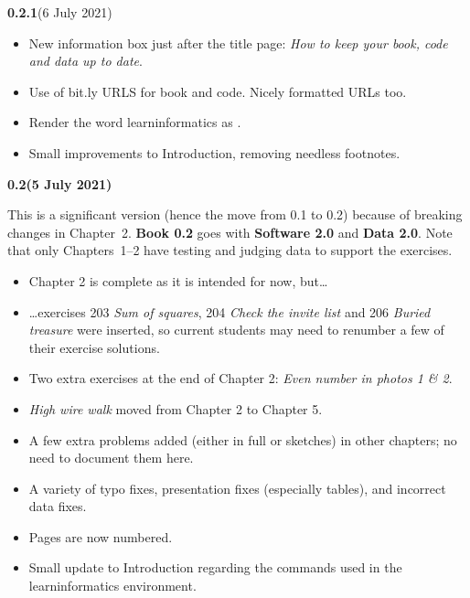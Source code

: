 

{
\small

\newcommand{\versionmarker}[2]{\textbf{#1}\quad(#2)}
\newcommand{\versionmarkerspecial}[2]{{\color{BrickRed}\bfseries#1\quad(#2)}}

\versionmarker{0.2.1}{6 July 2021}
\begin{itemize}
  \item New information box just after the title page: \emph{How to keep your book, code
    and data up to date}.
  \item Use of bit.ly URLS for book and code. Nicely formatted URLs too.
  \item Render the word learninformatics as \learninformatics{}.
  \item Small improvements to Introduction, removing needless footnotes.
\end{itemize}

\versionmarkerspecial{0.2}{5 July 2021}

This is a significant version (hence the move from 0.1 to 0.2) because of breaking changes
in Chapter~2. \textbf{Book 0.2} goes with \textbf{Software 2.0} and \textbf{Data 2.0}.
Note that only Chapters~1--2 have testing and judging data to support the exercises.

\begin{itemize}
  \item Chapter 2 is complete as it is intended for now, but\dots
  \item \dots exercises 203 \emph{Sum of squares}, 204 \emph{Check the invite list} and 206
    \emph{Buried treasure} were inserted, so current students may need to renumber a few
    of their exercise solutions.
  \item Two extra exercises at the end of Chapter 2: \emph{Even number in photos 1 \& 2}.
  \item \emph{High wire walk} moved from Chapter 2 to Chapter 5.
  \item A few extra problems added (either in full or sketches) in other chapters; no need
    to document them here.
  \item A variety of typo fixes, presentation fixes (especially tables), and incorrect
    data fixes.
  \item Pages are now numbered.
  \item Small update to Introduction regarding the commands used in the
    \textsf{learninformatics} environment.
\end{itemize}

}
